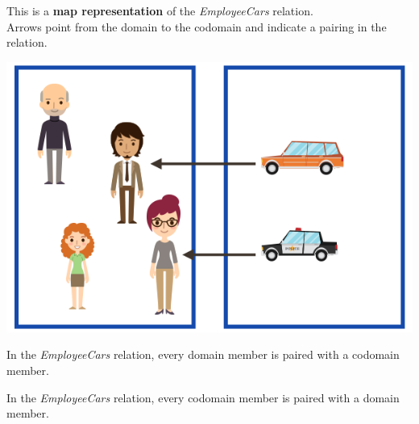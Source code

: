 \documentclass{ximera}
\author{Lee Wayand}
\begin{document}
\begin{exercise}

This is a \textbf{map representation} of the \textit{EmployeeCars} relation. \\


Arrows point from the domain to the codomain and indicate a pairing in the relation.


\begin{image}
\includegraphics{../../pics/func_maps/f_28.png}
\end{image}




\begin{question} 
In the \textit{EmployeeCars} relation, every domain member is paired with a codomain member.

\begin{multipleChoice}
\end{multipleChoice}
\end{question}







\begin{question} 
In the \textit{EmployeeCars} relation, every codomain member is paired with a domain member.

\begin{multipleChoice}
\end{multipleChoice}
\end{question}








\end{exercise}
\end{document}

